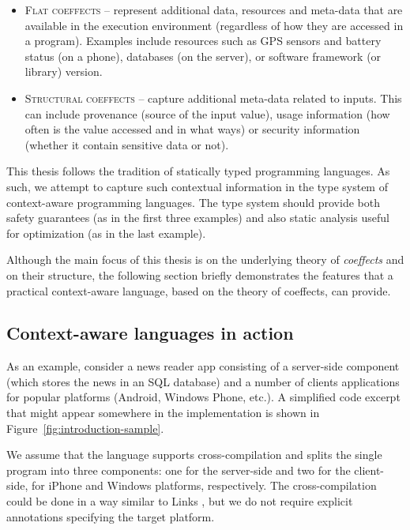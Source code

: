 \begin{itemize}
\item \textsc{Flat coeffects} -- represent additional data, resources and meta-data that are
   available in the execution environment (regardless of how they are accessed in a program).
   Examples include resources such as GPS sensors and battery status (on a phone), databases
   (on the server), or software framework (or library) version.

\item \textsc{Structural coeffects} -- capture additional meta-data related to inputs. This can include
   provenance (source of the input value), usage information (how often is the value
   accessed and in what ways) or security information (whether it contain sensitive data or not).
\end{itemize}
%
This thesis follows the tradition of statically typed programming languages. As such, we
attempt to capture such contextual information in the type system of context-aware programming
languages. The type system should provide both safety guarantees (as in the first three examples)
and also static analysis useful for optimization (as in the last example).

Although the main focus of this thesis is on the underlying theory of \emph{coeffects} and on
their structure, the following section briefly demonstrates the features that a practical
context-aware language, based on the theory of coeffects, can provide.


\subsection{Context-aware languages in action}
\label{sec:intro-context-example}

As an example, consider a news reader app consisting of a server-side component (which stores the 
news in an SQL database) and a number of clients applications for popular platforms (Android, Windows 
Phone, etc.). A simplified code excerpt that might appear somewhere in the implementation is shown in
Figure~\ref{fig:introduction-sample}.

We assume that the language supports cross-compilation and splits the single program into three
components: one for the server-side and two for the client-side, for iPhone and Windows platforms,
respectively. The cross-compilation could be done in a way similar to Links \cite{app-distributed-links},
but we do not require explicit annotations specifying the target platform.

